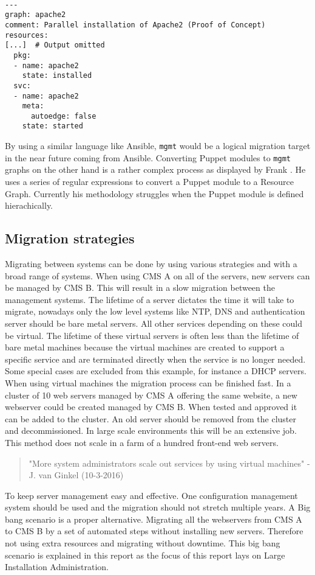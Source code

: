 \\
\begin{lstlisting}[caption={Snippet of Resource Graph Definition},label=lst:resgraph]
---
graph: apache2
comment: Parallel installation of Apache2 (Proof of Concept)
resources:
[...]  # Output omitted
  pkg:
  - name: apache2
    state: installed
  svc:
  - name: apache2
    meta:
      autoedge: false
    state: started
\end{lstlisting}
\noindent
By using a similar language like Ansible, \texttt{mgmt} would be a logical migration target in the near future coming from Ansible. Converting Puppet modules to \texttt{mgmt} graphs on the other hand is a rather complex process as displayed by Frank \cite{frank_2016}. He uses a series of regular expressions to convert a Puppet module to a Resource Graph. Currently his methodology struggles when the Puppet module is defined hierachically.

\subsection{Migration strategies}\label{subsec:migrationstrategies}
Migrating between systems can be done by using various strategies and with a broad range of systems. When using CMS A on all of the servers, new servers can be managed by CMS B. This will result in a slow migration between the management systems. The lifetime of a server dictates the time it will take to migrate, nowadays only the low level systems like NTP, DNS and authentication server should be bare metal servers. All other services depending on these could be virtual. The lifetime of these virtual servers is often less than the lifetime of bare metal machines because the virtual machines are created to support a specific service and are terminated directly when the service is no longer needed. Some special cases are excluded from this example, for instance a DHCP servers. When using virtual machines the migration process can be finished fast. In a cluster of 10 web servers managed by CMS A offering the same website, a new webserver could be created managed by CMS B. When tested and approved it can be added to the cluster. An old server should be removed from the cluster and decommissioned. In large scale environments this will be an extensive job. This method does not scale in a farm of a hundred front-end web servers.

\begin{quote}
"More system administrators scale out services by using virtual machines" - J. van Ginkel (10-3-2016)
\end{quote}

To keep server management easy and effective. One configuration management system should be used and the migration should not stretch multiple years. A Big bang scenario is a proper alternative. Migrating all the webservers from CMS A to CMS B by a set of automated steps without installing new servers. Therefore not using extra resources and migrating without downtime. This big bang scenario \cite{bigbang} is explained in this report as the focus of this report lays on Large Installation Administration.
